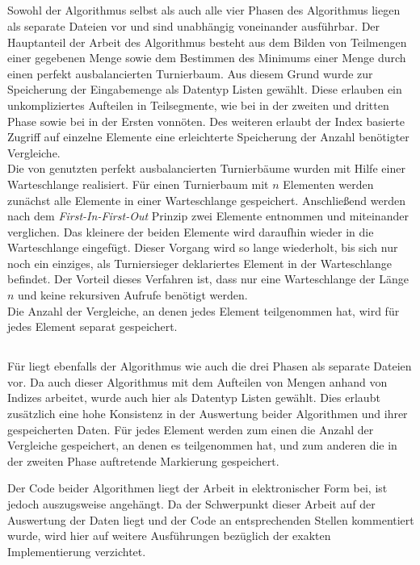\subsection{\Rm}
Sowohl der Algorithmus \Rm selbst als auch alle vier Phasen des Algorithmus liegen als separate Dateien vor und sind unabhängig voneinander ausführbar. Der Hauptanteil der Arbeit des Algorithmus besteht aus dem Bilden von Teilmengen einer gegebenen Menge sowie dem Bestimmen des Minimums einer Menge durch einen perfekt ausbalancierten Turnierbaum. Aus diesem Grund wurde zur Speicherung der Eingabemenge als Datentyp Listen gewählt. Diese erlauben ein unkompliziertes Aufteilen in Teilsegmente, wie bei \Rm in der zweiten und dritten Phase sowie bei \RM in der Ersten vonnöten. Des weiteren erlaubt der Index basierte Zugriff auf einzelne Elemente eine erleichterte Speicherung der Anzahl benötigter Vergleiche.\\[.05cm]
Die von \Rm  genutzten perfekt ausbalancierten Turnierbäume wurden mit Hilfe einer Warteschlange realisiert. Für einen Turnierbaum mit $n$ Elementen werden zunächst alle Elemente in einer Warteschlange gespeichert. Anschließend werden nach dem \textit{First-In-First-Out} Prinzip zwei Elemente entnommen und miteinander verglichen. Das kleinere der beiden Elemente wird daraufhin wieder in die Warteschlange eingefügt. Dieser Vorgang wird so lange wiederholt, bis sich nur noch ein einziges, als Turniersieger deklariertes Element in der Warteschlange befindet. Der Vorteil dieses Verfahren ist, dass nur eine Warteschlange der Länge $n$ und keine rekursiven Aufrufe benötigt werden.\\[.05cm]
Die Anzahl der Vergleiche, an denen jedes Element teilgenommen hat, wird für jedes Element separat gespeichert.

\subsection{\RM}
Für \RM liegt ebenfalls der Algorithmus wie auch die drei Phasen als separate Dateien vor. Da auch dieser Algorithmus mit dem Aufteilen von Mengen anhand von Indizes arbeitet, wurde auch hier als Datentyp Listen gewählt. Dies erlaubt zusätzlich eine hohe Konsistenz in der Auswertung beider Algorithmen und ihrer gespeicherten Daten.
Für jedes Element werden zum einen die Anzahl der Vergleiche gespeichert, an denen es teilgenommen hat, und zum anderen die in der zweiten Phase auftretende Markierung gespeichert.

\noindent
Der Code beider Algorithmen liegt der Arbeit in elektronischer Form bei, ist jedoch auszugsweise angehängt. Da der Schwerpunkt dieser Arbeit auf der Auswertung der Daten liegt und der Code an entsprechenden Stellen kommentiert wurde, wird hier auf weitere Ausführungen bezüglich der exakten Implementierung verzichtet.

